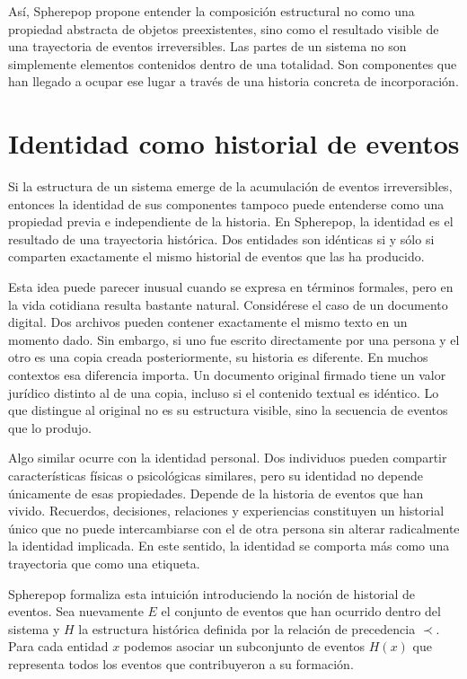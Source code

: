 \documentclass[12pt]{article}
\begin{document}
Así, Spherepop propone entender la composición estructural no como una propiedad abstracta de objetos preexistentes, sino como el resultado visible de una trayectoria de eventos irreversibles. Las partes de un sistema no son simplemente elementos contenidos dentro de una totalidad. Son componentes que han llegado a ocupar ese lugar a través de una historia concreta de incorporación.

\section{Identidad como historial de eventos}

Si la estructura de un sistema emerge de la acumulación de eventos irreversibles, entonces la identidad de sus componentes tampoco puede entenderse como una propiedad previa e independiente de la historia. En Spherepop, la identidad es el resultado de una trayectoria histórica. Dos entidades son idénticas si y sólo si comparten exactamente el mismo historial de eventos que las ha producido.

Esta idea puede parecer inusual cuando se expresa en términos formales, pero en la vida cotidiana resulta bastante natural. Considérese el caso de un documento digital. Dos archivos pueden contener exactamente el mismo texto en un momento dado. Sin embargo, si uno fue escrito directamente por una persona y el otro es una copia creada posteriormente, su historia es diferente. En muchos contextos esa diferencia importa. Un documento original firmado tiene un valor jurídico distinto al de una copia, incluso si el contenido textual es idéntico. Lo que distingue al original no es su estructura visible, sino la secuencia de eventos que lo produjo.

Algo similar ocurre con la identidad personal. Dos individuos pueden compartir características físicas o psicológicas similares, pero su identidad no depende únicamente de esas propiedades. Depende de la historia de eventos que han vivido. Recuerdos, decisiones, relaciones y experiencias constituyen un historial único que no puede intercambiarse con el de otra persona sin alterar radicalmente la identidad implicada. En este sentido, la identidad se comporta más como una trayectoria que como una etiqueta.

Spherepop formaliza esta intuición introduciendo la noción de historial de eventos. Sea nuevamente \(E\) el conjunto de eventos que han ocurrido dentro del sistema y \(H\) la estructura histórica definida por la relación de precedencia \( \prec \). Para cada entidad \(x\) podemos asociar un subconjunto de eventos \(H(x)\) que representa todos los eventos que contribuyeron a su formación.
\end{document}
